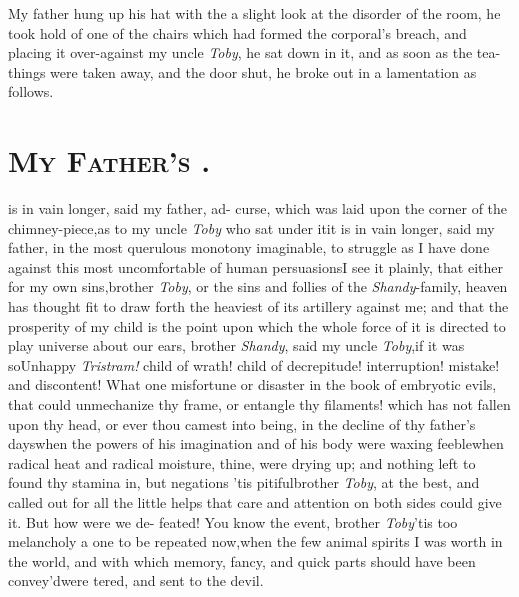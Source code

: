 \documentclass{article}
\begin{document}
My father hung up his hat with the  a slight look at the disorder of the room, he took
hold of one of the chairs which had formed the corporal’s
breach, and placing it over-against my uncle \textit{Toby}, he sat
down in it, and as soon as the tea-things were taken away, and the
door shut, he broke out in a lamentation as follows.

\section{\textsc{My Father's }.}

 is in vain longer, said my father,
ad-\break{}
curse, which was laid upon the corner of the chimney-piece,\tsk as
to my uncle \textit{Toby} who sat under it\tsk it is in vain
longer,
said my father, in the most querulous monotony imaginable,
to struggle as I have done against this most uncomfortable
of human persuasions\tsk I see it plainly, that either for
my own sins,\break brother \textit{Toby}, or the sins and follies
of the \textit{Shandy}-family, heaven has thought fit to
draw forth the heaviest of its artillery against me; and
that the prosperity of my child is the point upon which the
whole force of it is directed to play\tsh\break
{} universe about our ears,
brother \textit{Shandy}, said my uncle \textit{Toby},\tsk if
it was so\tsk Unhappy \textit{Tristram!} child of wrath!
child of decrepitude!  interruption! mistake! and
discontent! What one misfortune or disaster in the book of
embryotic evils, that could unmechanize thy frame, or
entangle thy filaments!  which has not fallen upon thy head,
or ever thou camest
into being, in the decline of thy father’s days\tsk when the
powers of his imagination and of his body were waxing
feeble\tsk when radical heat and radical moisture, 
 thine, were drying up;
and nothing left to found thy stamina in, but
negations\tsk\break\enlargethispage\baselineskip
\tsk ’tis pitiful\tsk brother \textit{Toby}, at the best,\break
and called out for all the little helps\break 
that care and attention on both sides\break 
could give it. But how were we de-\break
feated! You know the event, brother\break
\textit{Toby}\tsk ’tis too melancholy a one to be\break
repeated now,\tsk when the few animal\break
spirits I was worth in the world, and\break
with which memory, fancy, and quick\break
parts should have been convey’d\tsk were\break
{}
tered, and sent to the devil.\tsk{}
\end{document}

